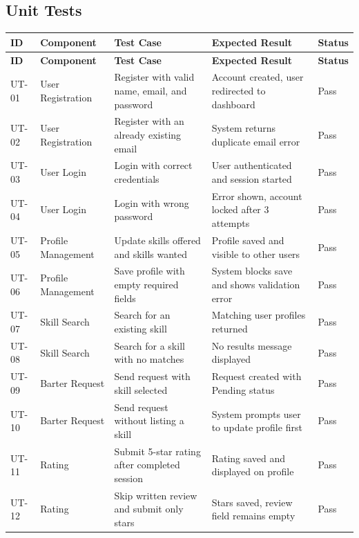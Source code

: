\documentclass[12pt,a4paper]{article}
\begin{document}
\subsection{Unit Tests}
\vspace{4pt}

\begin{longtable}{L{0.8cm} L{3cm} L{4cm} L{3.5cm} L{2.5cm}}
\toprule
\textbf{ID} & \textbf{Component} & \textbf{Test Case} & \textbf{Expected Result} & \textbf{Status} \\
\midrule
\endfirsthead
\toprule
\textbf{ID} & \textbf{Component} & \textbf{Test Case} & \textbf{Expected Result} & \textbf{Status} \\
\midrule
\endhead
\bottomrule
\endfoot
UT-01 & User Registration & Register with valid name, email, and password & Account created, user redirected to dashboard & Pass \\
UT-02 & User Registration & Register with an already existing email & System returns duplicate email error & Pass \\
UT-03 & User Login & Login with correct credentials & User authenticated and session started & Pass \\
UT-04 & User Login & Login with wrong password & Error shown, account locked after 3 attempts & Pass \\
UT-05 & Profile Management & Update skills offered and skills wanted & Profile saved and visible to other users & Pass \\
UT-06 & Profile Management & Save profile with empty required fields & System blocks save and shows validation error & Pass \\
UT-07 & Skill Search & Search for an existing skill & Matching user profiles returned & Pass \\
UT-08 & Skill Search & Search for a skill with no matches & No results message displayed & Pass \\
UT-09 & Barter Request & Send request with skill selected & Request created with Pending status & Pass \\
UT-10 & Barter Request & Send request without listing a skill & System prompts user to update profile first & Pass \\
UT-11 & Rating & Submit 5-star rating after completed session & Rating saved and displayed on profile & Pass \\
UT-12 & Rating & Skip written review and submit only stars & Stars saved, review field remains empty & Pass \\
\bottomrule
\end{longtable}
\end{document}
